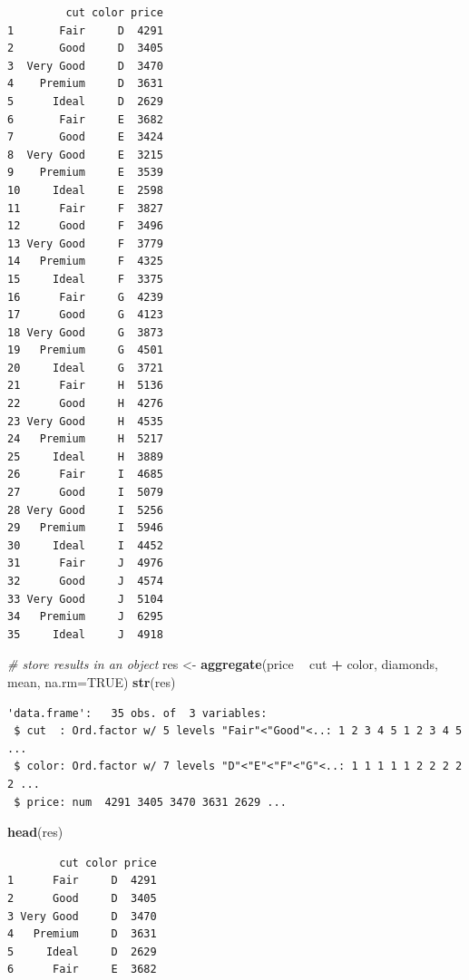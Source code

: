 \documentclass[
]{book}
\newenvironment{Shaded}{\begin{snugshade}}{\end{snugshade}}
\newcommand{\CommentTok}[1]{\textcolor[rgb]{0.56,0.35,0.01}{\textit{#1}}}
\newcommand{\DataTypeTok}[1]{\textcolor[rgb]{0.13,0.29,0.53}{#1}}
\newcommand{\KeywordTok}[1]{\textcolor[rgb]{0.13,0.29,0.53}{\textbf{#1}}}
\newcommand{\NormalTok}[1]{#1}
\newcommand{\OperatorTok}[1]{\textcolor[rgb]{0.81,0.36,0.00}{\textbf{#1}}}
\newcommand{\OtherTok}[1]{\textcolor[rgb]{0.56,0.35,0.01}{#1}}
\newcommand{\StringTok}[1]{\textcolor[rgb]{0.31,0.60,0.02}{#1}}
\begin{document}
\begin{verbatim}
         cut color price
1       Fair     D  4291
2       Good     D  3405
3  Very Good     D  3470
4    Premium     D  3631
5      Ideal     D  2629
6       Fair     E  3682
7       Good     E  3424
8  Very Good     E  3215
9    Premium     E  3539
10     Ideal     E  2598
11      Fair     F  3827
12      Good     F  3496
13 Very Good     F  3779
14   Premium     F  4325
15     Ideal     F  3375
16      Fair     G  4239
17      Good     G  4123
18 Very Good     G  3873
19   Premium     G  4501
20     Ideal     G  3721
21      Fair     H  5136
22      Good     H  4276
23 Very Good     H  4535
24   Premium     H  5217
25     Ideal     H  3889
26      Fair     I  4685
27      Good     I  5079
28 Very Good     I  5256
29   Premium     I  5946
30     Ideal     I  4452
31      Fair     J  4976
32      Good     J  4574
33 Very Good     J  5104
34   Premium     J  6295
35     Ideal     J  4918
\end{verbatim}

\begin{Shaded}
\begin{Highlighting}[]
\CommentTok{# store results in an object}
\NormalTok{res <-}\StringTok{ }\KeywordTok{aggregate}\NormalTok{(price }\OperatorTok{~}\StringTok{ }\NormalTok{cut }\OperatorTok{+}\StringTok{ }\NormalTok{color, diamonds, mean, }\DataTypeTok{na.rm=}\OtherTok{TRUE}\NormalTok{)}
\KeywordTok{str}\NormalTok{(res)}
\end{Highlighting}
\end{Shaded}

\begin{verbatim}
'data.frame':	35 obs. of  3 variables:
 $ cut  : Ord.factor w/ 5 levels "Fair"<"Good"<..: 1 2 3 4 5 1 2 3 4 5 ...
 $ color: Ord.factor w/ 7 levels "D"<"E"<"F"<"G"<..: 1 1 1 1 1 2 2 2 2 2 ...
 $ price: num  4291 3405 3470 3631 2629 ...
\end{verbatim}

\begin{Shaded}
\begin{Highlighting}[]
\KeywordTok{head}\NormalTok{(res)}
\end{Highlighting}
\end{Shaded}

\begin{verbatim}
        cut color price
1      Fair     D  4291
2      Good     D  3405
3 Very Good     D  3470
4   Premium     D  3631
5     Ideal     D  2629
6      Fair     E  3682
\end{verbatim}
\end{document}
